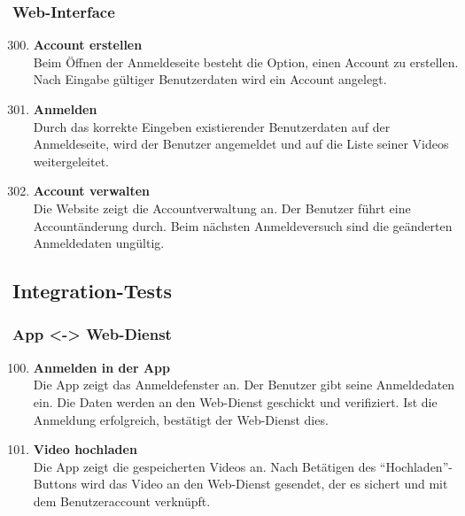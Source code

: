 \subsubsection{\gls{Web-Interface}}
\begin{enumerate}[\bfseries{TK}10]  
\setcounter{enumi}{299}{}
\item \textbf{Account erstellen} \hfill\\
Beim \"Offnen der Anmeldeseite besteht die Option, einen Account zu erstellen. Nach Eingabe g\"ultiger Benutzerdaten wird ein Account angelegt.

\item \textbf{Anmelden} \hfill\\
Durch das korrekte Eingeben existierender Benutzerdaten auf der Anmeldeseite, wird der Benutzer angemeldet und auf die Liste seiner Videos weitergeleitet.

\item \textbf{Account verwalten} \hfill\\
Die Website zeigt die Accountverwaltung an. Der Benutzer f\"uhrt eine Account\"anderung durch. Beim n\"achsten Anmeldeversuch sind die ge\"anderten Anmeldedaten ung\"ultig.

\end{enumerate}


\subsection{Integration-Tests}
\subsubsection{\gls{App} <-> \gls{Web-Dienst}}
\begin{enumerate}[\bfseries{TI}10]  
\setcounter{enumi}{99}{}

\item \textbf{Anmelden in der \gls{App}} \hfill\\
Die \gls{App} zeigt das Anmeldefenster an. Der Benutzer gibt seine Anmeldedaten ein. Die Daten werden an den \gls{Web-Dienst} geschickt und verifiziert. Ist die Anmeldung erfolgreich, bestätigt der Web-Dienst dies.

\item \textbf{Video hochladen} \hfill\\
Die \gls{App} zeigt die gespeicherten Videos an. Nach Bet\"atigen des ``Hochladen''-Buttons wird das Video an den \gls{Web-Dienst} gesendet, der es sichert und mit dem Benutzeraccount verkn\"upft.
\end{enumerate}

